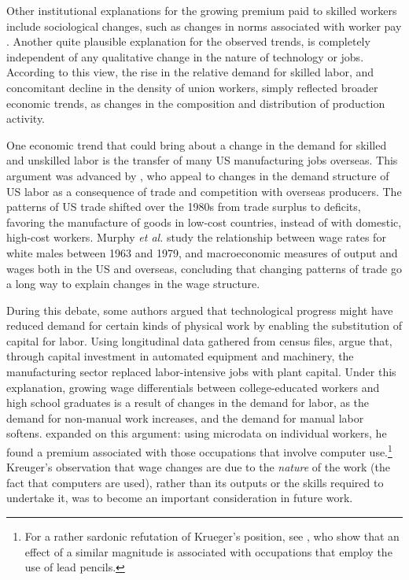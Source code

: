 Other institutional explanations for the growing premium paid to skilled workers include sociological changes, such as changes in norms associated with worker pay \citep{Mitchell1989}. Another quite plausible explanation for the observed trends, is completely independent of any qualitative change in the nature of technology or jobs. According to this view, the rise in the relative demand for skilled labor, and concomitant decline in the density of union workers,  simply reflected broader economic trends, as changes in the composition and distribution of production activity.

One economic trend that could bring about a change in the demand for skilled and unskilled labor is the transfer of many US manufacturing jobs overseas. This argument was advanced by \citet{Murphy1992}, who appeal to changes in the demand structure of US labor as a consequence of trade and competition with overseas producers. The patterns of US trade shifted over the 1980s from trade surplus to deficits, favoring the manufacture of goods in low-cost countries, instead of with domestic, high-cost workers. Murphy {\em et al.} study the relationship between wage rates for white males between 1963 and 1979, and macroeconomic measures of output and wages both in the US and overseas, concluding that changing patterns of trade go a long way to explain changes in the wage structure.

During this debate, some authors argued that technological progress might have reduced demand for certain kinds of physical work by enabling the substitution of capital for labor. Using longitudinal data gathered from census files, \citet{Davis1991} argue that, through capital investment in automated equipment and machinery, the manufacturing sector replaced labor-intensive jobs with plant capital. Under this explanation, growing wage differentials between college-educated workers and high school graduates is a result of changes in the demand for labor, as the demand for non-manual work increases, and the demand for manual labor softens. \citet{Krueger1993} expanded on this argument: using microdata on individual workers, he found a premium associated with those occupations that involve computer use.\footnote{For a rather sardonic refutation of Krueger's position, see \citet{DiNardo1997}, who show that an effect of a similar magnitude is associated with occupations that employ the use of lead pencils.} Kreuger's observation that wage changes are due to the {\em nature} of the work (the fact that computers are used), rather than its outputs or the skills required to undertake it, was to become an important consideration in future work.

